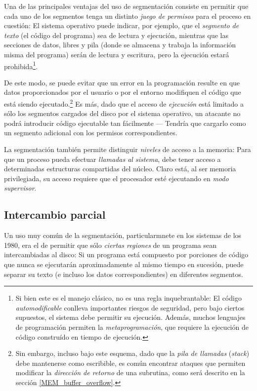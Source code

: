 \documentclass[11pt,fleqn]{book} %
\begin{document}
Una de las principales ventajas del uso de segmentación consiste en
permitir que cada uno de los segmentos tenga un distinto
\emph{juego de permisos} para el proceso en cuestión: El sistema operativo
puede indicar, por ejemplo, que el \emph{segmento de texto} (el código del
programa) sea de lectura y ejecución, mientras que las secciones de
datos, libres y pila (donde se almacena y trabaja la información misma
del programa) serán de lectura y escritura, pero la ejecución estará
prohibida\footnote{Si bien este es el manejo clásico, no es una regla
inquebrantable: El código \emph{automodificable} conlleva importantes
riesgos de seguridad, pero bajo ciertos supuestos, el sistema debe
permitir su ejecución. Además, muchos lenguajes de programación
permiten la \emph{metaprogramación}, que requiere la ejecución de código
construído en tiempo de ejecución. }.

De este modo, se puede evitar que un error en
la programación resulte en que datos proporcionados por el usuario o
por el entorno modifiquen el código que está siendo ejecutado.\footnote{Sin embargo, incluso bajo este esquema, dado que la \emph{pila de llamadas}
(\emph{stack}) debe mantenerse como escribible, es común encontrar ataques
que permiten modificar la \emph{dirección de retorno} de una subrutina,
como será descrito en la sección \ref{MEM_buffer_overflow}. } Es
más, dado que el acceso de \emph{ejecución} está limitado a sólo
los segmentos cargados del disco por el sistema operativo, un atacante
no podrá introducir código ejecutable tan fácilmente — Tendría que
cargarlo como un segmento adicional con los permisos correspondientes.

La segmentación también permite distinguir \emph{niveles} de acceso a la
memoria: Para que un proceso pueda efectuar \emph{llamadas al sistema},
debe tener acceso a determinadas estructuras compartidas del
núcleo. Claro está, al ser memoria privilegiada, su acceso requiere
que el procesador esté ejecutando en \emph{modo supervisor}.
\subsection{Intercambio parcial}
\label{sec-5-3-2}
\label{MEM_intercambio_parcial}


Un uso muy común de la segmentación, particularmnete en los sistemas
de los 1980, era el de permitir que sólo \emph{ciertas regiones} de un
programa sean intercambiadas al disco: Si un programa está compuesto
por porciones de código que nunca se ejecutarán aproximadamente al
mismo tiempo en sucesión, puede separar su texto (e incluso los datos
correspondientes) en diferentes segmentos.
\end{document}
